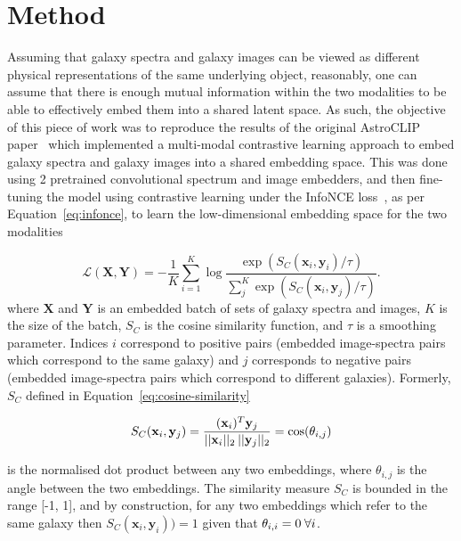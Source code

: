 
\section{Method}\label{sec:method}
Assuming that galaxy spectra and galaxy images can be viewed as different physical representations of the same underlying
object, reasonably, one can assume that there is enough mutual information within the two modalities to be able to effectively
embed them into a shared latent space.
As such, the objective of this piece of work was to reproduce the results of the original AstroCLIP paper~\citep{astroclip}
which implemented a multi-modal contrastive learning approach to embed galaxy spectra and galaxy images into a shared embedding
space.
This was done using 2 pretrained convolutional spectrum and image embedders, and then fine-tuning the model using contrastive
learning under the InfoNCE loss~\citep{oord2019}, as per Equation~\eqref{eq:infonce}, to learn the low-dimensional
embedding space for the two modalities

\begin{equation}
\label{eq:infonce}
    \mathcal{L}(\mathbf{X}, \mathbf{Y}) = - \frac{1}{K} \sum_{i=1}^K \log \frac{\exp(S_C(\mathbf{x}_i, \mathbf{y}_i) / \tau)}{\sum_{j}^K \exp(S_C(\mathbf{x}_i, \mathbf{y}_j) / \tau)}.
\end{equation}
where $\mathbf{X}$ and $\mathbf{Y}$ is an embedded batch of sets of galaxy spectra and images, $K$ is the size of the
batch, $S_C$ is the cosine similarity function, and $\tau$ is a smoothing parameter.
Indices $i$ correspond to positive pairs (embedded image-spectra pairs which correspond to the same galaxy) and $j$ corresponds
to negative pairs (embedded image-spectra pairs which correspond to different galaxies).
Formerly, $S_C$ defined in Equation~\eqref{eq:cosine-similarity}

\begin{equation}
\label{eq:cosine-similarity}
    S_C(\mathbf{x}_i, \mathbf{y}_j) = \frac{(\mathbf{x}_i)^{T} \mathbf{y}_j}{ ||\mathbf{x}_i||_{2} \hspace{0.2em} ||\mathbf{y}_j||_{2}}
    = \cos(\theta_{i,j})
\end{equation}

is the normalised dot product between any two embeddings, where $\theta_{i,j}$ is the angle between the two embeddings.
The similarity measure $S_C$ is bounded in the range [-1, 1], and by construction, for any two embeddings which refer to
the same galaxy then $S_C(\mathbf{x}_i, \mathbf{y}_i)) = 1$ given that $\theta_{i,i} = 0 \hspace{0.25em} \forall i$.

